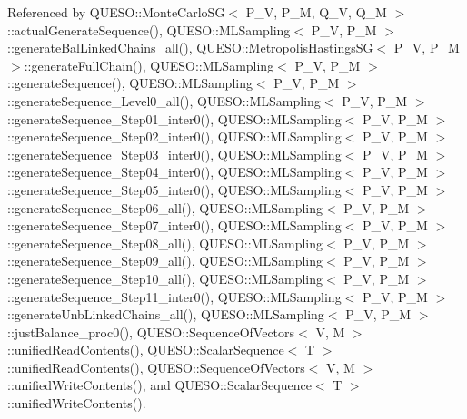 Referenced by Q\-U\-E\-S\-O\-::\-Monte\-Carlo\-S\-G$<$ P\-\_\-\-V, P\-\_\-\-M, Q\-\_\-\-V, Q\-\_\-\-M $>$\-::actual\-Generate\-Sequence(), Q\-U\-E\-S\-O\-::\-M\-L\-Sampling$<$ P\-\_\-\-V, P\-\_\-\-M $>$\-::generate\-Bal\-Linked\-Chains\-\_\-all(), Q\-U\-E\-S\-O\-::\-Metropolis\-Hastings\-S\-G$<$ P\-\_\-\-V, P\-\_\-\-M $>$\-::generate\-Full\-Chain(), Q\-U\-E\-S\-O\-::\-M\-L\-Sampling$<$ P\-\_\-\-V, P\-\_\-\-M $>$\-::generate\-Sequence(), Q\-U\-E\-S\-O\-::\-M\-L\-Sampling$<$ P\-\_\-\-V, P\-\_\-\-M $>$\-::generate\-Sequence\-\_\-\-Level0\-\_\-all(), Q\-U\-E\-S\-O\-::\-M\-L\-Sampling$<$ P\-\_\-\-V, P\-\_\-\-M $>$\-::generate\-Sequence\-\_\-\-Step01\-\_\-inter0(), Q\-U\-E\-S\-O\-::\-M\-L\-Sampling$<$ P\-\_\-\-V, P\-\_\-\-M $>$\-::generate\-Sequence\-\_\-\-Step02\-\_\-inter0(), Q\-U\-E\-S\-O\-::\-M\-L\-Sampling$<$ P\-\_\-\-V, P\-\_\-\-M $>$\-::generate\-Sequence\-\_\-\-Step03\-\_\-inter0(), Q\-U\-E\-S\-O\-::\-M\-L\-Sampling$<$ P\-\_\-\-V, P\-\_\-\-M $>$\-::generate\-Sequence\-\_\-\-Step04\-\_\-inter0(), Q\-U\-E\-S\-O\-::\-M\-L\-Sampling$<$ P\-\_\-\-V, P\-\_\-\-M $>$\-::generate\-Sequence\-\_\-\-Step05\-\_\-inter0(), Q\-U\-E\-S\-O\-::\-M\-L\-Sampling$<$ P\-\_\-\-V, P\-\_\-\-M $>$\-::generate\-Sequence\-\_\-\-Step06\-\_\-all(), Q\-U\-E\-S\-O\-::\-M\-L\-Sampling$<$ P\-\_\-\-V, P\-\_\-\-M $>$\-::generate\-Sequence\-\_\-\-Step07\-\_\-inter0(), Q\-U\-E\-S\-O\-::\-M\-L\-Sampling$<$ P\-\_\-\-V, P\-\_\-\-M $>$\-::generate\-Sequence\-\_\-\-Step08\-\_\-all(), Q\-U\-E\-S\-O\-::\-M\-L\-Sampling$<$ P\-\_\-\-V, P\-\_\-\-M $>$\-::generate\-Sequence\-\_\-\-Step09\-\_\-all(), Q\-U\-E\-S\-O\-::\-M\-L\-Sampling$<$ P\-\_\-\-V, P\-\_\-\-M $>$\-::generate\-Sequence\-\_\-\-Step10\-\_\-all(), Q\-U\-E\-S\-O\-::\-M\-L\-Sampling$<$ P\-\_\-\-V, P\-\_\-\-M $>$\-::generate\-Sequence\-\_\-\-Step11\-\_\-inter0(), Q\-U\-E\-S\-O\-::\-M\-L\-Sampling$<$ P\-\_\-\-V, P\-\_\-\-M $>$\-::generate\-Unb\-Linked\-Chains\-\_\-all(), Q\-U\-E\-S\-O\-::\-M\-L\-Sampling$<$ P\-\_\-\-V, P\-\_\-\-M $>$\-::just\-Balance\-\_\-proc0(), Q\-U\-E\-S\-O\-::\-Sequence\-Of\-Vectors$<$ V, M $>$\-::unified\-Read\-Contents(), Q\-U\-E\-S\-O\-::\-Scalar\-Sequence$<$ T $>$\-::unified\-Read\-Contents(), Q\-U\-E\-S\-O\-::\-Sequence\-Of\-Vectors$<$ V, M $>$\-::unified\-Write\-Contents(), and Q\-U\-E\-S\-O\-::\-Scalar\-Sequence$<$ T $>$\-::unified\-Write\-Contents().


